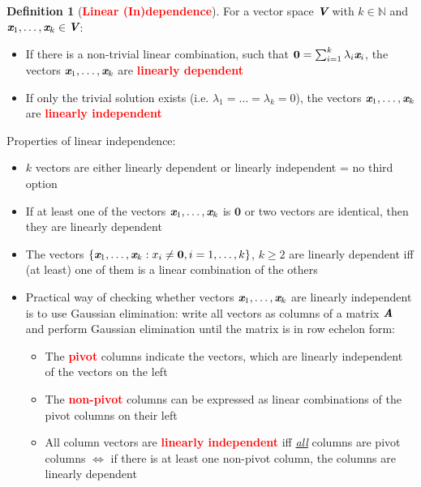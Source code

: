 \documentclass[12pt]{article}
\theoremstyle{definition}
\newtheorem{definition}{Definition}[section]
\newcommand{\keyword}[1]{\textbf{\textcolor{red}{#1}}}
\newcommand{\mat}[1]{\textit{\textbf{#1}}}
\begin{document}
        \begin{definition}[\keyword{Linear (In)dependence}]
            For a vector space $\mat{V}$ with $k\in\mathbb{N}$ and 
            $\mat{x}_1,\dots,\mat{x}_k\in\mat{V}$:
            \begin{itemize}
                \item If there is a non-trivial linear combination, such that 
                    $\textbf{0}=\sum_{i=1}^{k}\lambda_i\mat{x}_i$, the vectors 
                    $\mat{x}_1,\dots,\mat{x}_k$ are \keyword{linearly dependent}
                \item If only the trivial solution exists (i.e. 
                    $\lambda_1=\dots=\lambda_k=0$), the vectors 
                    $\mat{x}_1,\dots,\mat{x}_k$ are \keyword{linearly independent}
            \end{itemize}
            Properties of linear independence:
            \begin{itemize}
                \item $k$ vectors are either linearly dependent or linearly 
                    independent = no third option
                \item If at least one of the vectors $\mat{x}_1,\dots,\mat{x}_k$
                    is $\textbf{0}$ or two vectors are identical, then they are 
                    linearly dependent
                \item The vectors $\{\mat{x}_1,\dots,\mat{x}_k : x_i\neq\textbf{0}, i=1,\dots,k\}$, 
                    $k\geq 2$ are linearly dependent iff (at least) one of them 
                    is a linear combination of the others 
                \item Practical way of checking whether vectors 
                    $\mat{x}_1,\dots,\mat{x}_k$ are linearly independent is to 
                    use Gaussian elimination: write all vectors as columns of a 
                    matrix $\mat{A}$ and perform Gaussian elimination until the
                    matrix is in row echelon form:
                    \begin{itemize}
                        \item The \keyword{pivot} columns indicate the vectors, which are 
                            linearly independent of the vectors on the left
                        \item The \keyword{non-pivot} columns can be expressed as linear 
                            combinations of the pivot columns on their left 
                        \item All column vectors are \keyword{linearly independent} iff 
                            \underline{\textit{all}} columns are pivot columns 
                            $\Leftrightarrow$ if there is at least one non-pivot
                            column, the columns are linearly dependent 
                    \end{itemize}
            \end{itemize}
        \end{definition}
\end{document}
